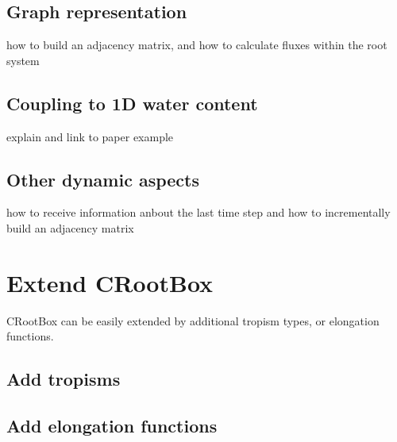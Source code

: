 \documentclass[a4paper]{article}
\begin{document}
\subsection{Graph representation}

how to build an adjacency matrix, and how to calculate fluxes within the root system

\subsection{Coupling to 1D water content}

explain and link to paper example

\subsection{Other dynamic aspects}

how to receive information anbout the last time step and 
how to incrementally build an adjacency matrix



\section{Extend CRootBox}

CRootBox can be easily extended by additional tropism types, or elongation functions. 

\subsection{Add tropisms}

\subsection{Add elongation functions}








\end{document}
